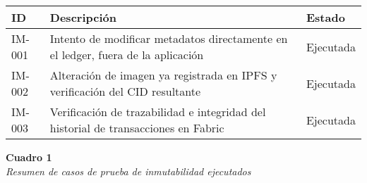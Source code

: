 \begin{center}
\begin{tabular}{|p{2cm}|p{6cm}|p{3cm}|}
    \hline
    \textbf{ID} & \textbf{Descripción} & \textbf{Estado} \\
    \hline
    IM-001 & Intento de modificar metadatos directamente en el ledger, fuera de la aplicación & Ejecutada \\
    \hline
    IM-002 & Alteración de imagen ya registrada en IPFS y verificación del CID resultante & Ejecutada \\
    \hline
    IM-003 & Verificación de trazabilidad e integridad del historial de transacciones en Fabric & Ejecutada \\
    \hline
\end{tabular}

\vspace{1em}
\noindent\textbf{Cuadro 1}\\[1em]
\textit{Resumen de casos de prueba de inmutabilidad ejecutados}
\end{center} 